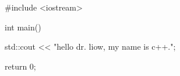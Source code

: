 \begin{console}
#include <iostream>

int main()
{
    std::cout << "hello dr. liow, my name is c++.\n";  
 
    return 0;   
}  
\end{console}   

